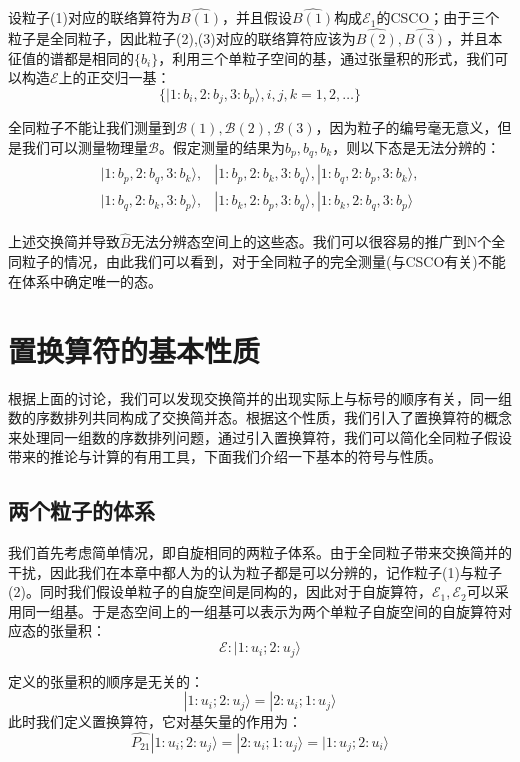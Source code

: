 设粒子(1)对应的联络算符为$\hat{B(1)}$，并且假设$\hat{B(1)}$构成$\mathscr{E}_1$的CSCO；由于三个粒子是全同粒子，因此粒子(2),(3)对应的联络算符应该为$\hat{B(2)},\hat{B(3)}$，并且本征值的谱都是相同的$\{b_i\}$，利用三个单粒子空间的基，通过张量积的形式，我们可以构造$\mathscr{E}$上的正交归一基：
\begin{equation}
    \{|1:b_i,2:b_j,3:b_p\rangle,i,j,k=1,2,\dots\}
\end{equation}

全同粒子不能让我们测量到$\mathscr{B}(1),\mathscr{B}(2),\mathscr{B}(3)$，因为粒子的编号毫无意义，但是我们可以测量物理量$\mathscr{B}$。假定测量的结果为$b_p,b_q,b_k$，则以下态是无法分辨的：
\begin{align}
    \begin{split}
        |1:b_p,2:b_q,3:b_k\rangle,&|1:b_p,2:b_k,3:b_q\rangle,|1:b_q,2:b_p,3:b_k\rangle,\\
        |1:b_q,2:b_k,3:b_p\rangle,&|1:b_k,2:b_p,3:b_q\rangle,|1:b_k,2:b_q,3:b_p\rangle
    \end{split}
\end{align}

上述交换简并导致$\hat{B}$无法分辨态空间上的这些态。我们可以很容易的推广到N个全同粒子的情况，由此我们可以看到，对于全同粒子的完全测量(与CSCO有关)不能在体系中确定唯一的态。
\section{置换算符的基本性质}
    根据上面的讨论，我们可以发现交换简并的出现实际上与标号的顺序有关，同一组数的序数排列共同构成了交换简并态。根据这个性质，我们引入了置换算符的概念来处理同一组数的序数排列问题，通过引入置换算符，我们可以简化全同粒子假设带来的推论与计算的有用工具，下面我们介绍一下基本的符号与性质。
    \subsection{两个粒子的体系}
    我们首先考虑简单情况，即自旋相同的两粒子体系。由于全同粒子带来交换简并的干扰，因此我们在本章中都人为的认为粒子都是可以分辨的，记作粒子(1)与粒子(2)。同时我们假设单粒子的自旋空间是同构的，因此对于自旋算符，$\mathscr{E}_1,\mathscr{E}_2$可以采用同一组基。于是态空间上的一组基可以表示为两个单粒子自旋空间的自旋算符对应态的张量积：
    \begin{equation}
        \mathscr{E}:|1:u_i;2:u_j\rangle
    \end{equation}
    
    定义的张量积的顺序是无关的：
    \begin{equation}
        |1:u_i;2:u_j\rangle=|2:u_i;1:u_j\rangle
    \end{equation}
    此时我们定义置换算符，它对基矢量的作用为：
    \begin{equation}
        \hat{P_{21}}|1:u_i;2:u_j\rangle=|2:u_i;1:u_j\rangle=|1:u_j;2:u_i\rangle
    \end{equation}
    
